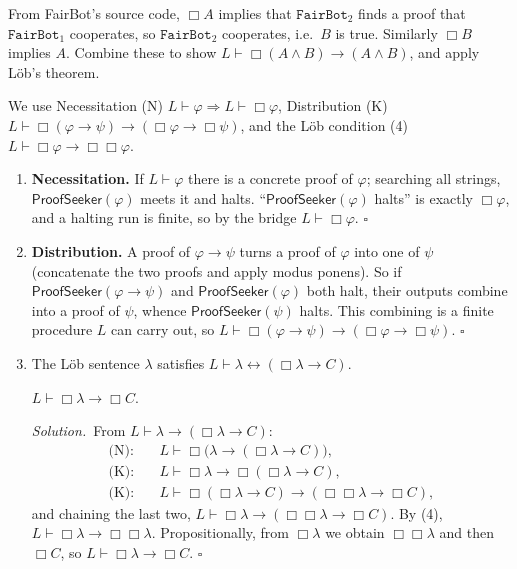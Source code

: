 \documentclass[11pt]{article}
\newcommand{\proves}{\vdash}
\newcommand{\PS}{\mathsf{ProofSeeker}}
\newcommand{\bx}{\Box}
\newcommand{\soln}{\medskip\noindent\textit{Solution.}\ }
\renewcommand{\qed}{\ensuremath{\square}}
\begin{document}
\begin{exercise}
\begin{enumerate}
\begin{hint}

From FairBot's source code, $\Box A$ implies that
$\texttt{FairBot}_2$ finds a proof that $\texttt{FairBot}_1$ cooperates, so
$\texttt{FairBot}_2$ cooperates, i.e.\ $B$ is true. Similarly $\Box B$ implies $A$.
Combine these to show $L \vdash \Box(A \wedge B) \to (A \wedge B)$, and apply L\"ob's
theorem.
\end{hint}
\end{enumerate}
\end{exercise}

\begin{solution}[ex:lob]
We use Necessitation (N) $L\proves\varphi\Rightarrow L\proves\bx\varphi$, Distribution (K) $L\proves\bx(\varphi\to\psi)\to(\bx\varphi\to\bx\psi)$, and the L\"ob condition (4) $L\proves\bx\varphi\to\bx\bx\varphi$.

\begin{enumerate}
\item \textbf{Necessitation.} If $L\proves\varphi$ there is a concrete proof of $\varphi$; searching all strings, $\PS(\varphi)$ meets it and halts. ``$\PS(\varphi)$ halts'' is exactly $\bx\varphi$, and a halting run is finite, so by the bridge $L\proves\bx\varphi$. \qed

\item \textbf{Distribution.} A proof of $\varphi\to\psi$ turns a proof of $\varphi$ into one of $\psi$ (concatenate the two proofs and apply modus ponens). So if $\PS(\varphi\to\psi)$ and $\PS(\varphi)$ both halt, their outputs combine into a proof of $\psi$, whence $\PS(\psi)$ halts. This combining is a finite procedure $L$ can carry out, so $L\proves\bx(\varphi\to\psi)\to(\bx\varphi\to\bx\psi)$. \qed

\item The L\"ob sentence $\lambda$ satisfies $L\proves\lambda\leftrightarrow(\bx\lambda\to C)$.

$L\proves\bx\lambda\to\bx C$.

\soln From $L\proves\lambda\to(\bx\lambda\to C)$:
\begin{align*}
\text{(N):}\quad & L\proves \bx\!\big(\lambda\to(\bx\lambda\to C)\big),\\
\text{(K):}\quad & L\proves \bx\lambda\to\bx(\bx\lambda\to C), \\
\text{(K):}\quad & L\proves \bx(\bx\lambda\to C)\to(\bx\bx\lambda\to\bx C),
\end{align*}
and chaining the last two, $L\proves\bx\lambda\to(\bx\bx\lambda\to\bx C)$. By (4), $L\proves\bx\lambda\to\bx\bx\lambda$. Propositionally, from $\bx\lambda$ we obtain $\bx\bx\lambda$ and then $\bx C$, so $L\proves\bx\lambda\to\bx C$. \qed


\end{enumerate}
\end{solution}
\end{document}
